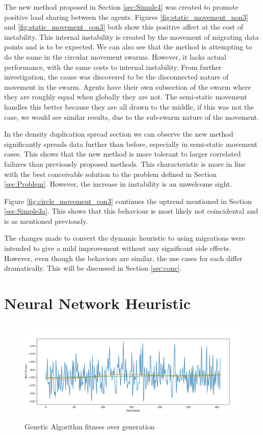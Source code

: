 \documentclass{UoYCSproject}
\begin{document}
The new method proposed in Section \ref{sec:Simple4} was created to promote positive load sharing between the agents.
Figures \ref{fig:static_movement_non3} and \ref{fig:static_movement_con3} both show this positive affect at the cost of instability.
This internal instability is created by the movement of migrating data points and is to be expected.
We can also see that the method is attempting to do the same in the circular movement swarms.
However, it lacks actual performance, with the same costs to internal instability.
From further investigation, the cause was discovered to be the disconnected nature of movement in the swarm.
Agents have their own subsection of the swarm where they are roughly equal when globally they are not.
The semi-static movement handles this better because they are all drawn to the middle, if this was not the case, we would see similar results, due to the sub-swarm nature of the movement.

In the density duplication spread section we can observe the new method significantly spreads data further than before, especially in semi-static movement cases.
This shows that the new method is more tolerant to larger correlated failures than previously proposed methods.
This characteristic is more in line with the best conceivable solution to the problem defined in Section \ref{sec:Problem}.
However, the increase in instability is an unwelcome sight.

Figure \ref{fig:circle_movement_con3} continues the uptrend mentioned in Section \ref{sec:Simple3a}.
This shows that this behaviour is most likely not coincidental and is as mentioned previously.

The changes made to convert the dynamic heuristic to using migrations were intended to give a mild improvement without any significant side effects.
However, even though the behaviors are similar, the use cases for each differ dramatically.
This will be discussed in Section \ref{sec:conc}.

\section{Neural Network Heuristic}
\label{sec:Simple5a}

\begin{figure}[htb]
\label{fig:FitnessGA}
\begin{center}
\centering
\includegraphics[height=5cm]{"./GA_max_fitness_0.03_gradient.png"}
\caption{Genetic Algorithm fitness over generation}
\end{center}
\end{figure}
\end{document}
